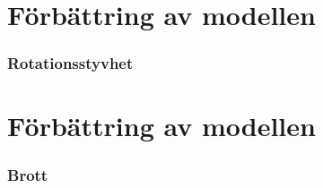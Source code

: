 \documentclass{beamer}
\begin{document}
\section{Förbättring av modellen}
\begin{frame}
\frametitle{Rotationsstyvhet}

\end{frame}

\section{Förbättring av modellen}
\begin{frame}
\frametitle{Brott}

\end{frame}
\end{document}
